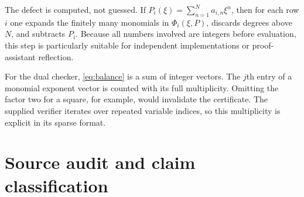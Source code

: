\documentclass[11pt,a4paper]{article}
\theoremstyle{definition}
\theoremstyle{remark}
\begin{document}
The defect is computed, not guessed. If $P_i(\xi)=\sum_{n=1}^Na_{i,n}\xi^n$,
then for each row $i$ one expands the finitely many monomials in
$\Phi_i(\xi,P)$, discards degrees above $N$, and subtracts $P_i$.
Because all numbers involved are integers before evaluation, this step is
particularly suitable for independent implementations or proof-assistant
reflection.

For the dual checker, \eqref{eq:balance} is a sum of integer vectors.
The $j$th entry of a monomial exponent vector is counted with its full
multiplicity. Omitting the factor two for a square, for example, would
invalidate the certificate. The supplied verifier iterates over repeated
variable indices, so this multiplicity is explicit in its sparse format.

\section{Source audit and claim classification}
\label{app:audit}
\end{document}
